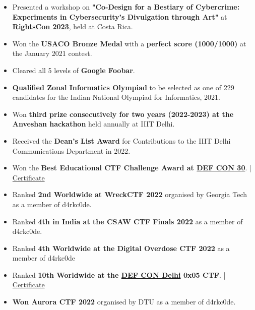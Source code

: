 \documentclass[10pt]{extarticle}
\begin{document}
\begin{contained}
\vspace{3pt}
\begin{itemize}
    \setlength\itemsep{5pt}
    \item Presented a workshop on \textbf{"Co-Design for a Bestiary of Cybercrime: Experiments in Cybersecurity's Divulgation through Art"} at \href{https://rightscon.summit.tc/t/rightscon-costa-rica-2023/events/co-design-session-for-a-bestiary-of-cybercrime-experiments-in-cybersecuritys-divulgation-through-art-fffy78vC13MK975jMRYrBt}{\textbf{RightsCon 2023}}, held at Costa Rica.
    \item Won the \textbf{USACO Bronze Medal} with a \textbf{perfect score (1000/1000)} at the January 2021 contest.
    \item Cleared all 5 levels of \textbf{Google Foobar}.
    \item \textbf{Qualified Zonal Informatics Olympiad} to be selected as one of 229 candidates for the Indian National Olympiad for Informatics, 2021.
    \item Won \textbf{third prize consecutively for two years (2022-2023) at the Anveshan hackathon} held annually at IIIT Delhi.
    \item Received the \textbf{Dean's List Award} for Contributions to the IIIT Delhi Communications Department in 2022.
    \item Won the \textbf{Best Educational CTF Challenge Award at \href{https://defcon.org/}{DEF CON 30}}. | \href{https://drive.google.com/file/d/1R2MEy4BXBFvZfaGATbql4gKBpBLYgiuj/view?usp=sharing}{Certificate}
    \item Ranked \textbf{2nd Worldwide at WreckCTF 2022} organised by Georgia Tech as a member of d4rkc0de.
    \item Ranked \textbf{4th in India at the CSAW CTF Finals 2022} as a member of d4rkc0de.
    \item Ranked \textbf{4th Worldwide at the Digital Overdose CTF 2022} as a member of d4rkc0de
    \item Ranked \textbf{10th Worldwide at the \href{https://defcon9111.org/}{DEF CON Delhi} 0x05 CTF}. |  \href{https://drive.google.com/file/d/1QYBzX-xQyPaXO9JjL7QrQBjV__Ia65fu/view?usp=sharing}{Certificate}
    \item \textbf{Won Aurora CTF 2022} organised by DTU as a member of d4rkc0de.
\end{itemize}
\vspace{5pt}
\end{contained}
\end{document}

